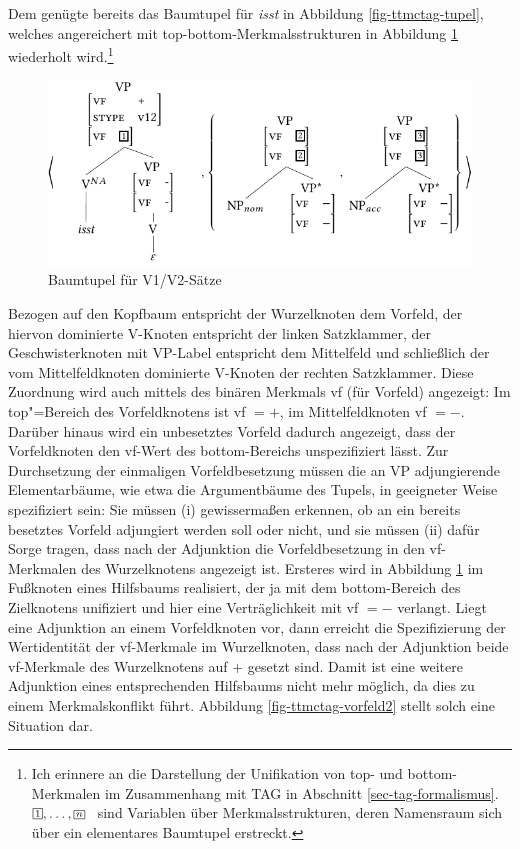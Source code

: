 Dem genügte bereits das Baumtupel für {\it isst} in Abbildung \ref{fig-ttmctag-tupel}, welches angereichert mit {\sc top}-{\sc bottom}-Merkmalsstrukturen in Abbildung \ref{fig-ttmctag-v12} wiederholt wird.\footnote{Ich erinnere an die Darstellung der Unifikation von {\sc top}- und {\sc bottom}-Merkmalen im Zusammenhang mit TAG in Abschnitt \ref{sec-tag-formalismus}. $\svar{1},\ldots,\svar{n}$ \ sind Variablen über Merkmalsstrukturen, deren Namensraum sich über ein elementares Baumtupel erstreckt.}  
\begin{figure}[t]
\centering
\includegraphics{graphics/abb76.pdf}
\caption{\label{fig-ttmctag-v12} Baumtupel für V1/V2-Sätze}
\end{figure} 
Bezogen auf den Kopfbaum entspricht der Wurzelknoten dem Vorfeld, der hiervon dominierte V-Knoten entspricht der linken Satzklammer, der Geschwisterknoten mit VP-Label entspricht dem Mittelfeld und schlie\ss lich der vom Mittelfeldknoten dominierte V-Knoten der rechten Satzklammer. Diese Zuordnung wird auch mittels des binären Merkmals {\sc vf} (für Vorfeld) angezeigt: Im {\sc top}"=Bereich des Vorfeldknotens ist {\sc vf} $= +$, im Mittelfeldknoten {\sc vf} $= -$. Darüber hinaus wird ein unbesetztes Vorfeld dadurch angezeigt, dass der Vorfeldknoten den {\sc vf}-Wert des {\sc bottom}-Bereichs unspezifiziert lässt. Zur Durchsetzung der einmaligen Vorfeldbesetzung müssen die an VP adjungierende Elementarbäume, wie etwa die Argumentbäume des Tupels, in geeigneter Weise spezifiziert sein: Sie müssen (i) gewisserma\ss en erkennen, ob an ein bereits besetztes Vorfeld adjungiert werden soll oder nicht, und sie  müssen (ii) dafür Sorge tragen, dass nach der Adjunktion die Vorfeldbesetzung in den {\sc vf}-Merkmalen des Wurzelknotens angezeigt ist. Ersteres wird in Abbildung \ref{fig-ttmctag-v12} im Fu\ss knoten eines Hilfsbaums realisiert, der ja mit dem {\sc bottom}-Bereich des Zielknotens unifiziert und hier eine Verträglichkeit mit {\sc vf} $=-$ verlangt. Liegt eine Adjunktion an einem Vorfeldknoten vor, dann erreicht die Spezifizierung der Wertidentität der {\sc vf}-Merkmale im Wurzelknoten, dass nach der Adjunktion beide {\sc vf}-Merkmale des Wurzelknotens auf $+$ gesetzt sind. Damit ist eine weitere Adjunktion eines entsprechenden Hilfsbaums nicht mehr möglich, da dies zu einem Merkmalskonflikt führt. Abbildung \ref{fig-ttmctag-vorfeld2} stellt solch eine Situation dar. 
